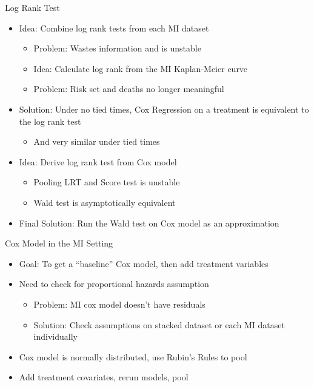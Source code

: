 \begin{frame}{Log Rank Test}
 \begin{itemize}
  \item Idea: Combine log rank tests from each MI dataset
  \begin{itemize}
  \item Problem: Wastes information and is unstable \cite{Marshall2009}
  \item Idea: Calculate log rank from the MI Kaplan-Meier curve
  \item Problem: Risk set and deaths no longer meaningful
  \end{itemize}

  \item Solution: Under no tied times, Cox Regression on a treatment is equivalent to the
log rank test
\begin{itemize}
 \item And very similar under tied times
\end{itemize}
\item Idea: Derive log rank test from Cox model
\begin{itemize}
 \item Pooling LRT and Score test is unstable \cite{Marshall2009}
 \item Wald test is asymptotically equivalent
\end{itemize}
 \item Final Solution: Run the Wald test on Cox model as an approximation

 \end{itemize}

\end{frame}

\begin{frame}{Cox Model in the MI Setting}
\begin{itemize}
 \item Goal: To get a ``baseline'' Cox model, then add treatment variables
 \item Need to check for proportional hazards assumption
 \begin{itemize}
  \item Problem:  MI cox model doesn't have residuals
  \item Solution: Check assumptions on stacked dataset or each MI dataset individually
 \end{itemize}
\item Cox model is normally distributed, use Rubin's Rules to pool
\item Add treatment covariates, rerun models, pool
\end{itemize}

 
\end{frame}
